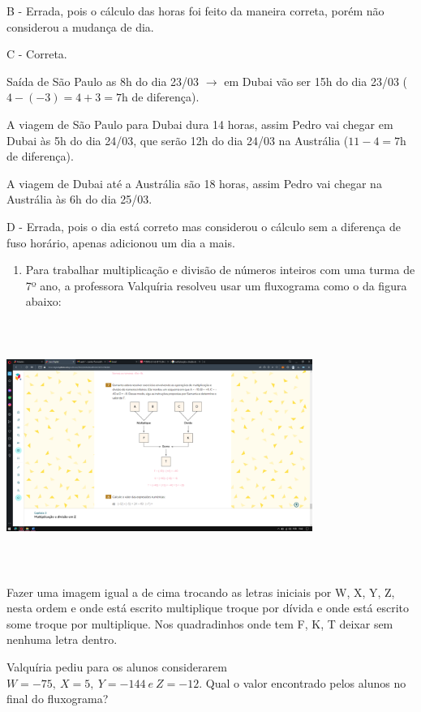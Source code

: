 B - Errada, pois o cálculo das horas foi feito da maneira correta, porém
não considerou a mudança de dia.

C - Correta.

Saída de São Paulo as 8h do dia 23/03 \(\rightarrow\) em Dubai vão ser
15h do dia 23/03 (\(4 - ( - 3) = 4 + 3 = 7\text{h\ }\)de diferença).

A viagem de São Paulo para Dubai dura 14 horas, assim Pedro vai chegar
em Dubai às 5h do dia 24/03, que serão 12h do dia 24/03 na Austrália
(\(11 - 4 = 7\text{h\ }\)de diferença).

A viagem de Dubai até a Austrália são 18 horas, assim Pedro vai chegar
na Austrália às 6h do dia 25/03.

D - Errada, pois o dia está correto mas considerou o cálculo sem a
diferença de fuso horário, apenas adicionou um dia a mais.

\begin{enumerate}
\def\labelenumi{\arabic{enumi})}
\setcounter{enumi}{1}
\tightlist
\item
  Para trabalhar multiplicação e divisão de números inteiros com uma
  turma de 7º ano, a professora Valquíria resolveu usar um fluxograma
  como o da figura abaixo:
\end{enumerate}

\includegraphics[width=3.92296in,height=3.18898in]{./imgSAEB_7_MAT/media/image3.png}

Fazer uma imagem igual a de cima trocando as letras iniciais por W, X,
Y, Z, nesta ordem e onde está escrito multiplique troque por dívida e
onde está escrito some troque por multiplique. Nos quadradinhos onde tem
F, K, T deixar sem nenhuma letra dentro.

Valquíria pediu para os alunos considerarem
\(W = - 75,\ X = 5,\ Y = - 144\ e\ Z = - 12\). Qual o valor encontrado
pelos alunos no final do fluxograma?

